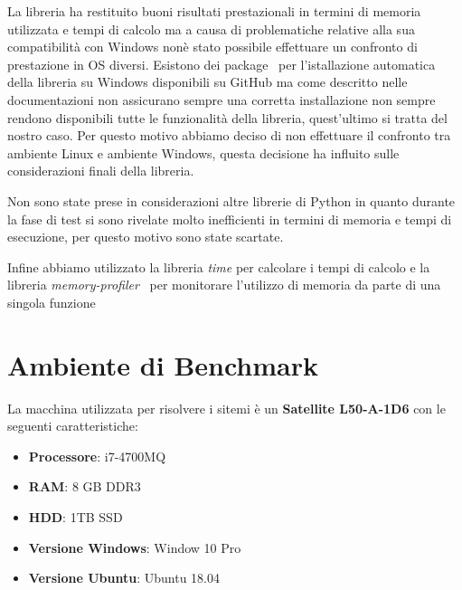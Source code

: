 \documentclass[a4paper,12pt,titlepage,oneside]{book}
\begin{document}
        La libreria ha restituito buoni risultati prestazionali in termini di memoria utilizzata e tempi di calcolo ma a causa di problematiche relative alla sua compatibilità con Windows nonè stato possibile effettuare un confronto di prestazione in OS diversi.
        Esistono dei package~\cite{package} per l'istallazione automatica della libreria su Windows disponibili su GitHub ma come descritto nelle documentazioni non assicurano sempre una corretta installazione non sempre rendono disponibili tutte le funzionalità della libreria, quest'ultimo si tratta del nostro caso.
        Per questo motivo abbiamo deciso di non effettuare il confronto tra ambiente Linux e ambiente Windows, questa decisione ha influito sulle considerazioni finali della libreria. 
        
        Non sono state prese in considerazioni altre librerie di Python in quanto durante la fase di test si sono rivelate molto inefficienti in termini di memoria e tempi di esecuzione, per questo motivo sono state scartate.\\[0.5cm]
        
        
        
        \vspace{0.5cm}
        
        \noindent Infine abbiamo utilizzato la libreria \textit{time} per calcolare i tempi di calcolo e la libreria \textit{memory-profiler}~\cite{profilerpython} per monitorare l'utilizzo di memoria da parte di una singola funzione
    
    \newpage
    \section{Ambiente di Benchmark}
    La macchina utilizzata per risolvere i sitemi è un \textbf{Satellite L50-A-1D6} con le seguenti caratteristiche:
    \begin{itemize}
      \item \textbf{Processore}: i7-4700MQ
      \item \textbf{RAM}: 8 GB DDR3
      \item \textbf{HDD}: 1TB SSD
      \item \textbf{Versione Windows}: Window 10 Pro
      \item \textbf{Versione Ubuntu}: Ubuntu 18.04
    \end{itemize}
    
\end{document}
